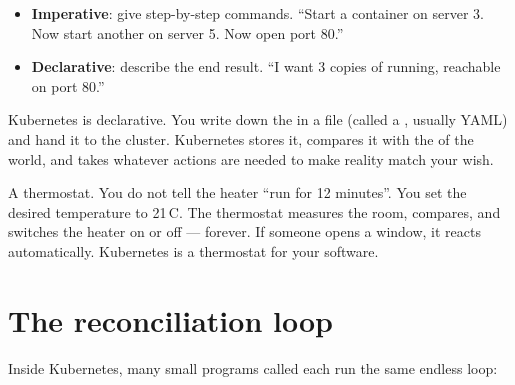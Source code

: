 \begin{itemize}
  \item \textbf{Imperative}: give step-by-step commands. ``Start a container on
        server 3. Now start another on server 5. Now open port 80.''
  \item \textbf{Declarative}: describe the end result. ``I want 3 copies of
         running, reachable on port 80.''
\end{itemize}

Kubernetes is declarative. You write down the  in a file
(called a , usually YAML) and hand it to the cluster. Kubernetes
stores it, compares it with the  of the world, and takes
whatever actions are needed to make reality match your wish.

\begin{analogy}
A thermostat. You do not tell the heater ``run for 12 minutes''. You set the
desired temperature to 21\,\textdegree C. The thermostat measures the room,
compares, and switches the heater on or off --- forever. If someone opens a
window, it reacts automatically. Kubernetes is a thermostat for your software.
\end{analogy}

\section{The reconciliation loop}

Inside Kubernetes, many small programs called  each run the
same endless loop:

\begin{center}
\end{center}

